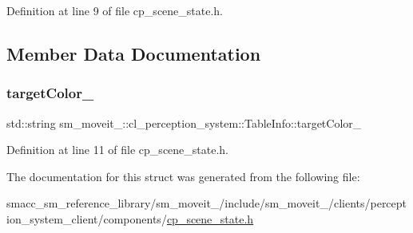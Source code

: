Definition at line 9 of file cp\+\_\+scene\+\_\+state.\+h.



\subsection{Member Data Documentation}
\mbox{\label{structsm__moveit__4_1_1cl__perception__system_1_1TableInfo_ad4361daafb35048ab3d507850f02eeba}} 
\subsubsection{\texorpdfstring{target\+Color\+\_\+}{targetColor\_}}
{\footnotesize\ttfamily std\+::string sm\+\_\+moveit\+\_\+::cl\+\_\+perception\+\_\+system\+::\+Table\+Info\+::target\+Color\+\_\+}



Definition at line 11 of file cp\+\_\+scene\+\_\+state.\+h.



The documentation for this struct was generated from the following file\+:\begin{DoxyCompactItemize}
\item 
smacc\+\_\+sm\+\_\+reference\+\_\+library/sm\+\_\+moveit\+\_/include/sm\+\_\+moveit\+\_/clients/perception\+\_\+system\+\_\+client/components/\hyperlink{cp__scene__state_8h}{cp\+\_\+scene\+\_\+state.\+h}\end{DoxyCompactItemize}
